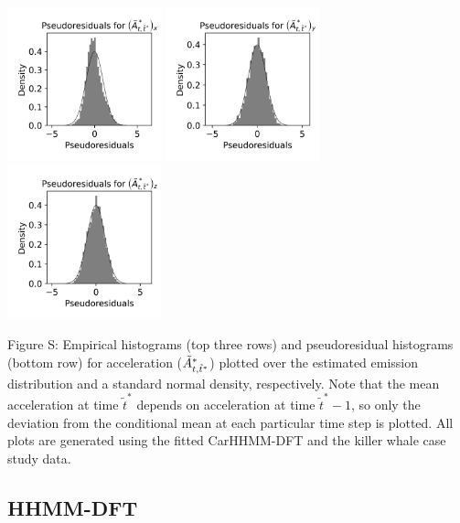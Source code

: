 \documentclass{article}
\begin{document}
\begin{center}
        \includegraphics[width=1.75in]{../Plots/2019/20190902-182840-CATs_OB_1_0_267_CarHHMM2_pseudresids_Ax.png}
        \includegraphics[width=1.75in]{../Plots/2019/20190902-182840-CATs_OB_1_0_267_CarHHMM2_pseudresids_Ay.png}
        \includegraphics[width=1.75in]{../Plots/2019/20190902-182840-CATs_OB_1_0_267_CarHHMM2_pseudresids_Az.png}
        \end{center}
        
        \noindent Figure S: Empirical histograms (top three rows) and pseudoresidual histograms (bottom row) for acceleration ($\tilde{A}^*_{t,\tilde t^*}$) plotted over the estimated emission distribution and a standard normal density, respectively. Note that the mean acceleration at time $\tilde t^*$ depends on acceleration at time $\tilde t^*-1$, so only the deviation from the conditional mean at each particular time step is plotted. All plots are generated using the fitted CarHHMM-DFT and the killer whale case study data.
        \addtocounter{fignum}{1}
        
        \newpage
        
        \subsection{HHMM-DFT}
        
\end{document}
